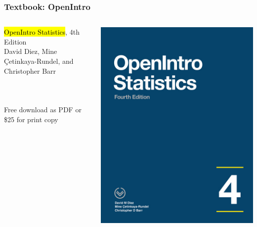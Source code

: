 \documentclass[slidestop,compress,mathserif]{beamer}
\begin{document}
\begin{frame}
	\frametitle{Textbook: OpenIntro}
	\begin{columns}
		\begin{minipage}[t]{\linewidth}
		\vspace{0pt}
			\hl{OpenIntro Statistics}, 4th Edition \\
			David Diez, Mine \c{C}etinkaya-Rundel, and Christopher Barr \\
			\\
			 \\
			\\
			Free download as PDF or \$25 for print copy
		\end{minipage}
		\begin{minipage}[t]{\linewidth}
		\vspace{0pt}
		\centering
		\includegraphics[width=0.9\columnwidth]{figures/openintro_cover.jpeg}
		\end{minipage}
	\end{columns}
\end{frame}
\end{document}
